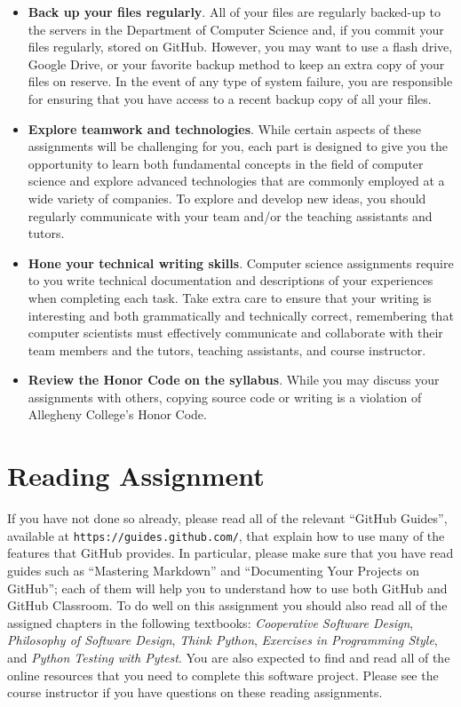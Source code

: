 \documentclass[11pt]{article}
\newcommand{\cooperative}{{\em Cooperative Software Design\/}}
\newcommand{\philosophy}{{\em Philosophy of Software Design\/}}
\newcommand{\thinkpython}{{\em Think Python\/}}
\newcommand{\programmingstyle}{{\em Exercises in Programming Style\/}}
\newcommand{\pytest}{{\em Python Testing with Pytest\/}}
\newcommand{\url}[1]{\lstinline{#1}}
\begin{document}
\begin{itemize}
\item {\bf Back up your files regularly}. All of your files are regularly
  backed-up to the servers in the Department of Computer Science and, if you
  commit your files regularly, stored on GitHub. However, you may want to use a
  flash drive, Google Drive, or your favorite backup method to keep an extra
  copy of your files on reserve. In the event of any type of system failure,
  you are responsible for ensuring that you have access to a recent backup copy
  of all your files.

\item {\bf Explore teamwork and technologies}. While certain aspects of these
  assignments will be challenging for you, each part is designed to give you the
  opportunity to learn both fundamental concepts in the field of computer
  science and explore advanced technologies that are commonly employed at a wide
  variety of companies. To explore and develop new ideas, you should regularly
  communicate with your team and/or the teaching assistants and tutors.

\item {\bf Hone your technical writing skills}. Computer science assignments
  require to you write technical documentation and descriptions of your
  experiences when completing each task. Take extra care to ensure that your
  writing is interesting and both grammatically and technically correct,
  remembering that computer scientists must effectively communicate and
  collaborate with their team members and the tutors, teaching assistants, and
  course instructor.

\item {\bf Review the Honor Code on the syllabus}. While you may discuss your
  assignments with others, copying source code or writing is a violation of
  Allegheny College's Honor Code.

\end{itemize}

\section*{Reading Assignment}



If you have not done so already, please read all of the relevant ``GitHub
Guides'', available at \url{https://guides.github.com/}, that explain how to use
many of the features that GitHub provides. In particular, please make sure that
you have read guides such as ``Mastering Markdown'' and ``Documenting Your
Projects on GitHub''; each of them will help you to understand how to use both
GitHub and GitHub Classroom.
%
To do well on this assignment you should also read all of the assigned chapters
in the following textbooks: \cooperative, \philosophy, \thinkpython,
\programmingstyle, and \pytest.
%
You are also expected to find and read all of the online resources that you need
to complete this software project.
%
Please see the course instructor if you have questions on these reading
assignments.
\end{document}
